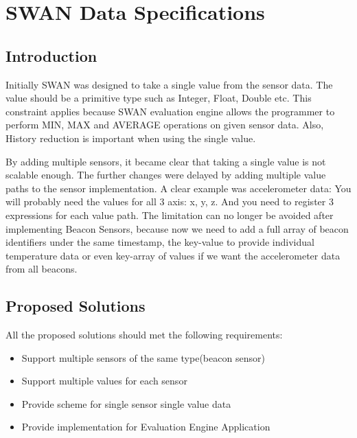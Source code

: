 
\chapter{SWAN Data Specifications}\label{ssec:swandataspecifications} %

\label{Chapter4} %



\section{Introduction}
Initially SWAN was designed to take a single value from the sensor data.
The value should be a primitive type such as Integer, Float, Double etc.
This constraint applies because SWAN evaluation engine allows the programmer to perform MIN, MAX and AVERAGE operations on given sensor data.
Also, History reduction is important when using the single value.

By adding multiple sensors, it became clear that taking a single value is not scalable enough. 
The further changes were delayed by adding multiple value paths to the sensor implementation. 
A clear example was accelerometer data: You will probably need the values for all 3 axis: x, y, z.
And you need to register 3 expressions for each value path.
The limitation can no longer be avoided after implementing Beacon Sensors, because now we need to add a full array of beacon identifiers under the same timestamp,
the key-value to provide individual temperature data or even key-array of values if we want the accelerometer data from all beacons.

\section{Proposed Solutions}
All the proposed solutions should met the following requirements:
\begin{itemize}
 \item Support multiple sensors of the same type(beacon sensor)
 \item Support multiple values for each sensor
 \item Provide scheme for single sensor single value data
 \item Provide implementation for Evaluation Engine Application
\end{itemize}

